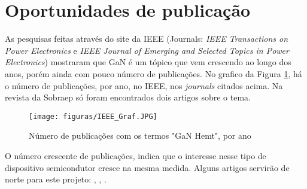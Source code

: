 \section{Oportunidades de publicação}
As pesquisas feitas através do site da IEEE (Journals: \textit{IEEE Transactions on Power Electronics} e \textit{IEEE Journal of Emerging and Selected Topics in Power Electronics}) mostraram que GaN é um tópico que vem crescendo ao longo dos anos, porém ainda com pouco número de publicações. No grafico da Figura \ref{FigPublications}, há o número de publicações, por ano, no IEEE, nos \textit{journals} citados acima. Na revista da Sobraep só foram encontrados dois artigos sobre o tema. 
\begin{figure}[H]
\caption{Número de publicações com os termos "GaN Hemt", por ano}
 \centering %
\texttt{[image: figuras/IEEE\_Graf.JPG]}
\label{FigPublications}
\end{figure}
\noindent O número crescente de publicações, indica que o interesse nesse tipo de dispositivo semicondutor cresce na mesma medida. Alguns artigos servirão de norte para este projeto: \cite{Chu}, \cite{Huang}, \cite{mitova}.



